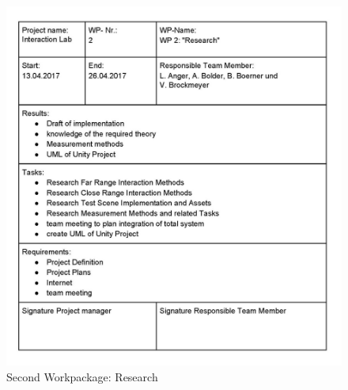 \begin{figure}[H] 
	\center 
	\includegraphics[width= 16 cm]{Images/Workpackages_Seite_2.jpg}			
	\caption[]{Second Workpackage: Research}
	\label{fig:Workpackage2}
\end{figure} 

